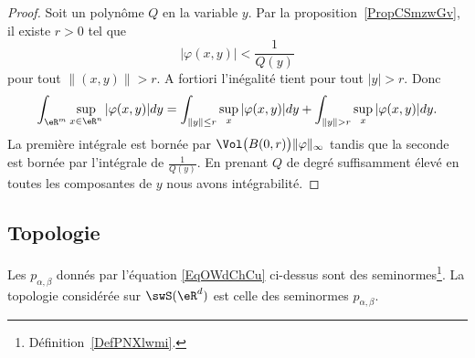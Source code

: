 \begin{proof}
	Soit un polynôme \( Q\) en la variable \( y\). Par la proposition~\ref{PropCSmzwGv}, il existe \( r>0\) tel que
	\begin{equation}
		| \varphi(x,y) |<\frac{1}{ Q(y) }
	\end{equation}
	pour tout \( \| (x,y) \|>r\). A fortiori l'inégalité tient pour tout \( | y |>r\). Donc
	\begin{equation}
		\int_{\eR^m}\sup_{x\in \eR^n}| \varphi(x,y) |dy=\int_{\| y \|\leq r}\sup_{x}| \varphi(x,y) |dy+\int_{ \| y \|>r  }\sup_{x}| \varphi(x,y) |dy.
	\end{equation}
	La première intégrale est bornée par \( \Vol\big( B(0,r) \big)\| \varphi \|_{\infty}\) tandis que la seconde est bornée par l'intégrale de \( \frac{1}{ Q(y) }\). En prenant \( Q\) de degré suffisamment élevé en toutes les composantes de \( y\) nous avons intégrabilité.
\end{proof}

\subsection{Topologie}

\begin{lemmaDef}        \label{LEMDEFooZEFVooMMmiBr}
	Les \( p_{\alpha,\beta}\) donnés par l'équation \eqref{EqOWdChCu} ci-dessus sont des seminormes\footnote{Définition~\ref{DefPNXlwmi}.}. La topologie considérée sur \( \swS(\eR^d)\) est celle des seminormes \( p_{\alpha,\beta}\).
\end{lemmaDef}

